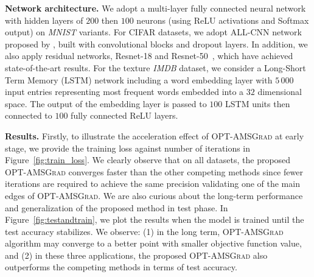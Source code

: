 \documentclass[11pt]{article}
\theoremstyle{k}
\begin{document}
\textbf{Network architecture.} We adopt a multi-layer fully connected neural network with hidden layers of $200$ then $100$ neurons (using \textrm{ReLU} activations and \textrm{Softmax} output) on \textit{MNIST} variants. 
For CIFAR datasets, we adopt ALL-CNN network proposed by \citep{CNN15}, built with convolutional blocks and dropout layers.
 In addition, we also apply residual networks, Resnet-18 and Resnet-50~\citep{Rnet16}, which have achieved state-of-the-art results.
For the texture \textit{IMDB} dataset, we consider a Long-Short Term Memory (LSTM) network \citep{gers1999learning} including a word embedding layer with $5\,000$ input entries representing most frequent words embedded into a $32$ dimensional space. 
The output of the embedding layer is passed to $100$ LSTM units then connected to $100$ fully connected \textrm{ReLU} layers. 

\textbf{Results.} 
Firstly, to illustrate the acceleration effect of \textsc{OPT-AMSGrad} at early stage, we provide the training loss against number of iterations in Figure~\ref{fig:train_loss}. 
We clearly observe that on all datasets, the proposed \textsc{OPT-AMSGrad} converges faster than the other competing methods since fewer iterations are required to achieve the same precision validating one of the main edges of \textsc{OPT-AMSGrad}.
We are also curious about the long-term performance and generalization of the proposed method in test phase.
In Figure~\ref{fig:testandtrain}, we plot the results when the model is trained until the test accuracy stabilizes. 
We observe: \textsf{(1)} in the long term, \textsc{OPT-AMSGrad} algorithm may converge to a better point with smaller objective function value, and \textsf{(2)} in these three applications, the proposed \textsc{OPT-AMSGrad} also outperforms the competing methods in terms of test accuracy. 
\end{document}
